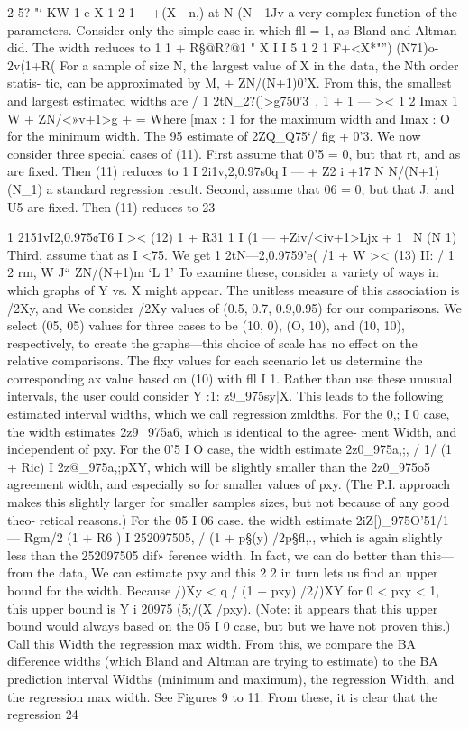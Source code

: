 2
 5? "‘ KW 1 e  X
1 2 1
—+(X—n,) at
\/N (N—1Jv%
a very complex function of the parameters. Consider only the simple case in which
ﬂl = 1, as Bland and Altman did. The width reduces to
1
 1 + R§@R?@\/1 "  X
I I 5
1 2 1
\/F+<X*"”) (N71)o-2v(1+R(%
For a sample of size N, the largest value of X in the data, the Nth order statis-
tic, can be approximated by M, + ZN/(N+1)0'X. From this, the smallest and largest
estimated widths are
/ 1
2tN_2?(]>g750'3~, 1 +  1 —   >< 
1 2 Imax 1
W + ZN/<»v+1>g + =
Where [max : 1 for the maximum width and Imax : O for the minimum width. The
95%
estimate of
2ZQ_Q75‘/ ﬁg + 0'3.
We now consider three special cases of (11). First assume that 0'5 = 0, but that
rt, and as are ﬁxed. Then (11) reduces to
1 I
2i1v,2,0.97s0q I — + Z2 i +17
N N/(N+1)(N_1)
a standard regression result. Second, assume that 06 = 0, but that J, and U5 are
ﬁxed. Then (11) reduces to
23



1
2151vI2,0.975¢T6 I >< (12)
1 + R31
1 I
(1 — +Ziv/<iv+1>Ljx + 1~
N (N 1)
Third, assume that as I <75. We get
1
2tN—2,0.9759'e( /1 + W >< (13)
II:
/ 1 2 rm,
W J“ ZN/(N+1)m ‘L 1'
To examine these, consider a variety of ways in which graphs of Y vs. X might
appear. The unitless measure of this association is /2Xy, and We consider /2Xy values
of (0.5, 0.7, 0.9,0.95) for our comparisons. We select (05, 05) values for three cases
to be (10, 0), (O, 10), and (10, 10), respectively, to create the graphs—this choice of
scale has no effect on the relative comparisons. The ﬂxy values for each scenario let
us determine the corresponding ax value based on (10) with ﬂl I 1.
Rather than use these unusual intervals, the user could consider Y :1: z9_975sy|X.
This leads to the following estimated interval widths, which we call regression zmldths.
For the 0,; I 0 case, the width estimates 2z9_975a6, which is identical to the agree-
ment Width, and independent of pxy. For the 0'5 I O case, the width estimate
2z0_975a,;, / 1/ (1 + Ric) I 2z@_975a,;pXY, which will be slightly smaller than the 2z0_975o5
agreement width, and especially so for smaller values of pxy. (The P.I. approach
makes this slightly larger for smaller samples sizes, but not because of any good theo-
retical reasons.) For the 05 I 06 case. the width estimate 2\/iZ[)_975O'51/1 — Rgm/2 (1 + R6 ) I
2\/52097505, / (1 + p§(y) /2p§ﬂ,., which is again slightly less than the 2\/52097505 dif»
ference width.
In fact, we can do better than this—from the data, We can estimate pxy and this
2 2
in turn lets us ﬁnd an upper bound for the width. Because /)Xy < q / (1 + pxy) /2/)XY
for 0 < pxy < 1, this upper bound is Y i 20975 (5;/(X /pxy). (Note: it appears that
this upper bound would always based on the 05 I 0 case, but but we have not
proven this.) Call this Width the regression max width. From this, we compare the
BA difference widths (which Bland and Altman are trying to estimate) to the BA
prediction interval Widths (minimum and maximum), the regression Width, and the
regression max width. See Figures 9 to 11. From these, it is clear that the regression
24



